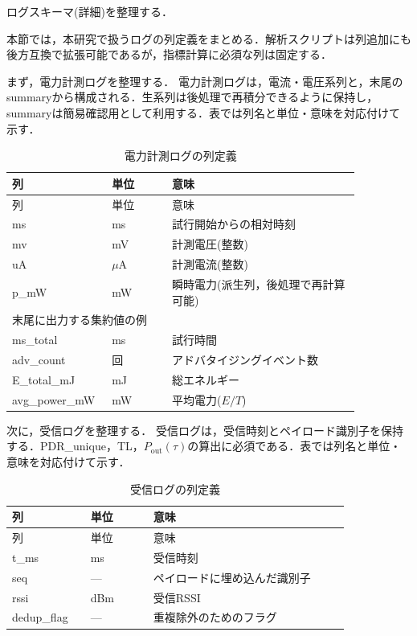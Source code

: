 ﻿%
ログスキーマ(詳細)を整理する．
\label{sec:log_schema}

本節では，本研究で扱うログの列定義をまとめる．解析スクリプトは列追加にも後方互換で拡張可能であるが，指標計算に必須な列は固定する．

まず，電力計測ログを整理する．
電力計測ログは，電流・電圧系列と，末尾のsummaryから構成される．生系列は後処理で再積分できるように保持し，summaryは簡易確認用として利用する．表では列名と単位・意味を対応付けて示す．

\begin{longtable}{p{0.20\linewidth}p{0.16\linewidth}p{0.50\linewidth}}
  \caption{電力計測ログの列定義}\label{tab:txsd_schema}\\
  \toprule
  列 & 単位 & 意味 \\
  \midrule
  \endfirsthead
  \toprule
  列 & 単位 & 意味 \\
  \midrule
  \endhead
  ms & ms & 試行開始からの相対時刻 \\
  mv & mV & 計測電圧(整数) \\
  uA & $\mu$A & 計測電流(整数) \\
  p\_mW & mW & 瞬時電力(派生列，後処理で再計算可能) \\
  \midrule
  \multicolumn{3}{l}{末尾に出力する集約値の例} \\
  \midrule
  ms\_total & ms & 試行時間 \\
  adv\_count & 回 & アドバタイジングイベント数 \\
  E\_total\_mJ & mJ & 総エネルギー \\
  avg\_power\_mW & mW & 平均電力($E/T$) \\
  \bottomrule
\end{longtable}

次に，受信ログを整理する．
受信ログは，受信時刻とペイロード識別子を保持する．PDR\_unique，TL，$P_{\mathrm{out}}(\tau)$の算出に必須である．表では列名と単位・意味を対応付けて示す．

\begin{longtable}{p{0.20\linewidth}p{0.16\linewidth}p{0.50\linewidth}}
  \caption{受信ログの列定義}\label{tab:rx_schema}\\
  \toprule
  列 & 単位 & 意味 \\
  \midrule
  \endfirsthead
  \toprule
  列 & 単位 & 意味 \\
  \midrule
  \endhead
  t\_ms & ms & 受信時刻 \\
  seq & --- & ペイロードに埋め込んだ識別子 \\
  rssi & dBm & 受信RSSI \\
  dedup\_flag & --- & 重複除外のためのフラグ \\
  \bottomrule
\end{longtable}

